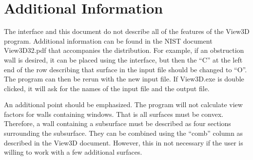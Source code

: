 \section{Additional Information}\label{additional-information}

The interface and this document do not describe all of the features of the View3D program. Additional information can be found in the NIST document View3D32.pdf that accompanies the distribution. For example, if an obstruction wall is desired, it can be placed using the interface, but then the ``C'' at the left end of the row describing that surface in the input file should be changed to ``O''. The program can then be rerun with the new input file. If View3D.exe is double clicked, it will ask for the names of the input file and the output file.

An additional point should be emphasized. The program will not calculate view factors for walls containing windows. That is all surfaces must be convex. Therefore, a wall containing a subsurface must be described as four sections surrounding the subsurface. They can be combined using the ``comb'' column as described in the View3D document. However, this in not necessary if the user is willing to work with a few additional surfaces.
